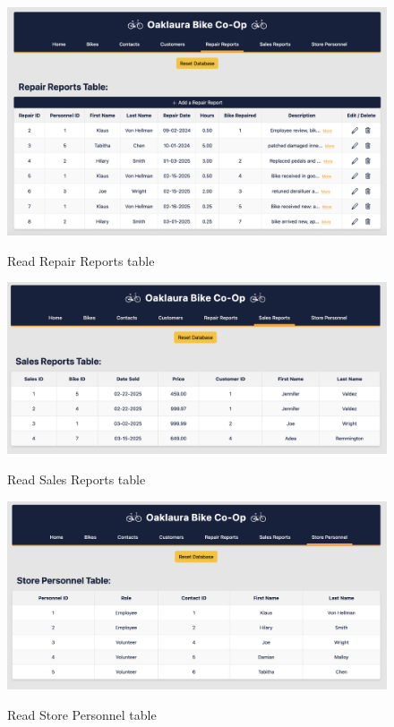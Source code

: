 \documentclass{article}
\begin{document}
\begin{figure}[H]
    \centering
    \caption{Read Repair Reports table}
    \vspace{0.2cm}
    \includegraphics[width=1.0\textwidth]{UI_screenshots/Read_RepairReports.png}
    \label{fig:Read Repair Reports table}
\end{figure}

\begin{figure}[H]
    \centering
    \caption{Read Sales Reports table}
    \vspace{0.2cm}
    \includegraphics[width=1.0\textwidth]{UI_screenshots/Read_SalesReport_Page.png}
    \label{fig:Read Sales Reports table}
\end{figure}

\begin{figure}[H]
    \centering
    \caption{Read Store Personnel table}
    \vspace{0.2cm}
    \includegraphics[width=1.0\textwidth]{UI_screenshots/Read_StorePersonnel_Page.png}
    \label{fig:Read Store Personnel table}
\end{figure}
\end{document}
